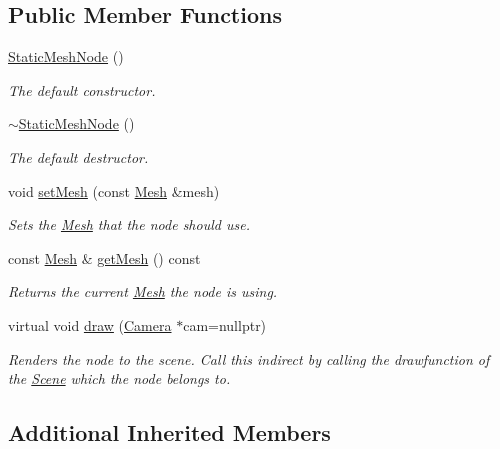 \subsection*{Public Member Functions}
\begin{DoxyCompactItemize}
\item 
\hyperlink{classburn_1_1_static_mesh_node_a051ef5fe091cf8e93cc4dd1bae753cbd}{Static\-Mesh\-Node} ()
\begin{DoxyCompactList}\small\item\em The default constructor. \end{DoxyCompactList}\item 
\hyperlink{classburn_1_1_static_mesh_node_a68e00b329768da175ee153c46069364e}{$\sim$\-Static\-Mesh\-Node} ()
\begin{DoxyCompactList}\small\item\em The default destructor. \end{DoxyCompactList}\item 
void \hyperlink{classburn_1_1_static_mesh_node_af78ecebdfd7c25997caf35ef4ebecdfb}{set\-Mesh} (const \hyperlink{classburn_1_1_mesh}{Mesh} \&mesh)
\begin{DoxyCompactList}\small\item\em Sets the \hyperlink{classburn_1_1_mesh}{Mesh} that the node should use. \end{DoxyCompactList}\item 
const \hyperlink{classburn_1_1_mesh}{Mesh} \& \hyperlink{classburn_1_1_static_mesh_node_ad269a91df547f3a3092d193e4210e081}{get\-Mesh} () const 
\begin{DoxyCompactList}\small\item\em Returns the current \hyperlink{classburn_1_1_mesh}{Mesh} the node is using. \end{DoxyCompactList}\item 
virtual void \hyperlink{classburn_1_1_static_mesh_node_a7ff88bee9757061b0393ae5324e7989b}{draw} (\hyperlink{classburn_1_1_camera}{Camera} $\ast$cam=nullptr)
\begin{DoxyCompactList}\small\item\em Renders the node to the scene. Call this indirect by calling the drawfunction of the \hyperlink{classburn_1_1_scene}{Scene} which the node belongs to. \end{DoxyCompactList}\end{DoxyCompactItemize}
\subsection*{Additional Inherited Members}


